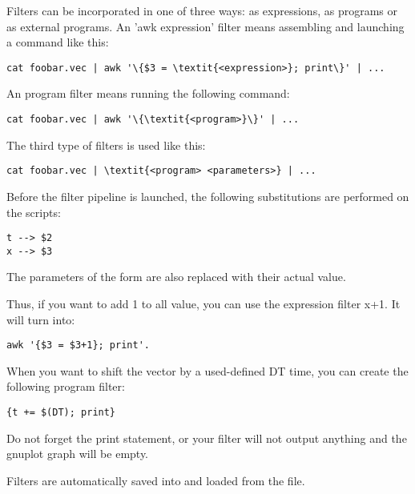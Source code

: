 Filters can be incorporated in one of three ways: as 
expressions, as  programs or as external programs. An 'awk
expression' filter means assembling and launching a command like this:

\begin{Verbatim}[commandchars=\\\{\}]
cat foobar.vec | awk '\{$3 = \textit{<expression>}; print\}' | ...
\end{Verbatim}

An  program filter means running the following command:

\begin{Verbatim}[commandchars=\\\{\}]
cat foobar.vec | awk '\{\textit{<program>}\}' | ...
\end{Verbatim}

The third type of filters is used like this:

\begin{Verbatim}[commandchars=\\\{\}]
cat foobar.vec | \textit{<program> <parameters>} | ...
\end{Verbatim}

Before the filter pipeline is launched, the following substitutions 
are performed on the  scripts:

\begin{Verbatim}
t --> $2
x --> $3
\end{Verbatim}


The parameters of the form  are also replaced with 
their actual value.

Thus, if you want to add 1 to all value, you can use the 
expression filter x+1. It will turn into:

\begin{Verbatim}
awk '{$3 = $3+1}; print'.
\end{Verbatim}  


When you want to shift the vector by a used-defined DT time, 
you can create the following  program filter: 

\begin{Verbatim}
{t += $(DT); print}
\end{Verbatim}

Do not forget the print statement, or your filter will not output 
anything and the gnuplot graph will be empty.

Filters are automatically saved into and loaded from the 
file.


